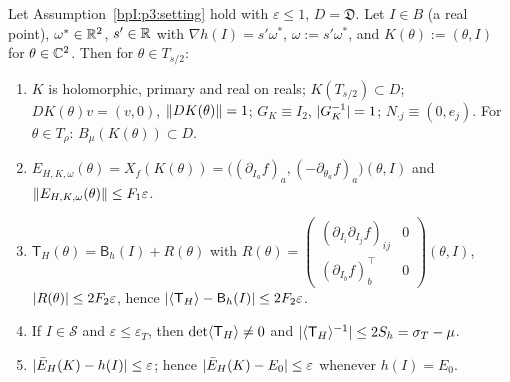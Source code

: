 \begin{lemma}[The flat torus of $H=h+f$]\label{bpI:p3:torus}
Let Assumption~\ref{bpI:p3:setting} hold with $\varepsilon\le1$, $D=\mathfrak D$. Let $I\in B$ (a real point), $\omega^*\in\mathbb{R}^2$, $s'\in\mathbb{R}$ with $\nabla h(I)=s'\omega^*$, $\omega:=s'\omega^*$, and $K(\theta):=(\theta,I)$ for $\theta\in\mathbb{C}^2$.
Then for $\theta\in T_{s/2}$:
\begin{enumerate}[label=(\alph*)]
\item $K$ is holomorphic, primary and real on reals; $K(T_{s/2})\subset D$; $DK(\theta)v=(v,0)$, $\lVert DK(\theta)\rVert=1$; $G_K\equiv I_2$, $\lvert G_K^{-1}\rvert=1$; $N_{\cdot j}\equiv(0,e_j)$.
For $\theta\in T_\rho$: $B_\mu(K(\theta))\subset D$.
\item $E_{H,K,\omega}(\theta)=X_f(K(\theta))=\bigl((\partial_{I_a}f)_a,(-\partial_{\theta_a}f)_a\bigr)(\theta,I)$ and $\lVert E_{H,K,\omega}(\theta)\rVert\le F_1\varepsilon$.
\item $\mathsf T_H(\theta)=\mathsf B_h(I)+R(\theta)$ with
$R(\theta)=\left(\begin{smallmatrix}(\partial_{I_i}\partial_{I_j}f)_{ij}&0\\(\partial_{I_b}f)_b^{\top}&0\end{smallmatrix}\right)(\theta,I)$, $\lvert R(\theta)\rvert\le2F_2\varepsilon$, hence $\lvert \langle \mathsf T_H\rangle-\mathsf B_h(I)\rvert\le2F_2\varepsilon$.
\item If $I\in\mathcal S$ and $\varepsilon\le\varepsilon_T$, then $\det\langle \mathsf T_H\rangle\ne0$ and $\lvert \langle \mathsf T_H\rangle^{-1}\rvert\le2S_h=\sigma_T-\mu$.
\item $\lvert \bar E_H(K)-h(I)\rvert\le\varepsilon$; hence $\lvert \bar E_H(K)-E_0\rvert\le\varepsilon$ whenever $h(I)=E_0$.
\end{enumerate}
\end{lemma}
